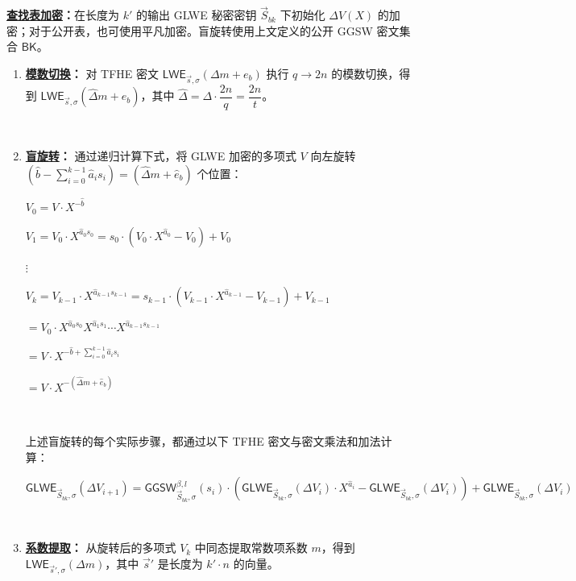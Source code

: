 \begin{tcolorbox}[title={\textbf{\tboxlabel{\ref*{subsec:tfhe-summary}} TFHE 噪声自举流程}}]

\textbf{\underline{查找表加密}：}在长度为 $k'$ 的输出 GLWE 秘密密钥 $\vec S_{bk}$ 下初始化 $\Delta V(X)$ 的加密；对于公开表，也可使用平凡加密。盲旋转使用上文定义的公开 GGSW 密文集合 $\textsf{BK}$。

  
\begin{enumerate}
\item \textbf{\underline{模数切换}：} 对 TFHE 密文 $\textsf{LWE}_{\vec{s}, \sigma}(\Delta m + e_b)$ 执行 $q \rightarrow 2n$ 的模数切换，得到 $\textsf{LWE}_{\vec{s}, \sigma}(\hat{\Delta} m + \hat e_b)$，其中 $\hat\Delta = \Delta \cdot \dfrac{2n}{q} = \dfrac{2n}{t}$。

$ $

\item \textbf{\underline{盲旋转}：} 通过递归计算下式，将 GLWE 加密的多项式 $V$ 向左旋转 $(\hat{b} - \sum\limits_{i=0}^{k-1}{\hat{a}_is_i}) = (\hat{\Delta}m + \hat{e}_b)$ 个位置：

$V_0 = V \cdot X^{-\hat{b}}$

$V_1 = V_0 \cdot X^{\hat{a}_0s_0} = s_0 \cdot (V_0 \cdot X^{\hat{a}_0} - V_0) + V_0$

\text{ } $\vdots$

$V_k = V_{k-1} \cdot X^{\hat{a}_{k-1}s_{k-1}} = s_{k-1} \cdot (V_{k-1} \cdot X^{\hat{a}_{k-1}} - V_{k-1}) + V_{k-1}$

$= V_0 \cdot X^{\hat{a}_0s_0}X^{\hat{a}_1s_1}\cdots X^{\hat{a}_{k-1}s_{k-1}}$

$= V \cdot X^{- \hat{b} + \sum_{i=0}^{k-1}{\hat{a}_is_i}} $

$ = V \cdot X^{-(\hat{\Delta}m + \hat{e}_b)}$

$ $

\noindent 上述盲旋转的每个实际步骤，都通过以下 TFHE 密文与密文乘法和加法计算：

$\textsf{GLWE}_{\vec{S}_{bk}, \sigma}(\Delta V_{i+1}) = \textsf{GGSW}_{\vec{S}_{bk}, \sigma}^{\beta, l}(s_i) \cdot (\textsf{GLWE}_{\vec{S}_{bk}, \sigma}(\Delta V_i) \cdot X^{\hat{a}_i} - \textsf{GLWE}_{\vec{S}_{bk}, \sigma}(\Delta V_i)) + \textsf{GLWE}_{\vec{S}_{bk}, \sigma}(\Delta V_i)$

$ $

\item \textbf{\underline{系数提取}：} 从旋转后的多项式 $V_k$ 中同态提取常数项系数 $m$，得到 $\textsf{LWE}_{\vec{s}', \sigma}(\Delta m)$，其中 $\vec{s}'$ 是长度为 $k' \cdot n$ 的向量。


\end{enumerate}
\end{tcolorbox}
